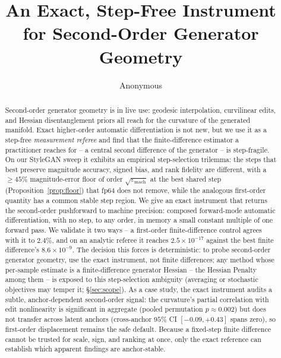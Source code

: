 \documentclass[10pt]{article}
\title{An Exact, Step-Free Instrument for Second-Order Generator Geometry}
\author{\name Anonymous}
\newcommand{\eps}{\varepsilon}
\begin{document}
\maketitle

\begin{abstract}
Second-order generator geometry is in live use: geodesic interpolation, curvilinear
edits, and Hessian disentanglement priors all reach for the curvature of the generated
manifold. Exact higher-order automatic differentiation is not new, but we use it as a
step-free \emph{measurement referee} and find that the finite-difference estimator a
practitioner reaches for -- a central second difference of the generator -- is step-fragile.
On our StyleGAN sweep it exhibits an empirical step-selection trilemma: the steps that best
preserve magnitude accuracy, signed bias, and rank fidelity are different, with a $\geq45\%$
magnitude-error floor of order $\sqrt{\eps_{\mathrm{mach}}}$ at the best shared step
(Proposition~\ref{prop:floor}) that fp64 does not remove, while the analogous first-order
quantity has a common stable step region. We give an exact instrument that returns the
second-order pushforward to machine precision: composed forward-mode automatic
differentiation, with no step, to any order, in memory a small constant multiple of one
forward pass. We validate it two ways -- a first-order finite-difference control agrees
with it to $2.4\%$, and on an analytic referee it reaches $2.5\times10^{-17}$ against the
best finite difference's $8.6\times10^{-9}$. The decision this forces is deterministic:
to probe second-order generator geometry, use the exact instrument, not finite
differences; any method whose per-sample estimate is a finite-difference generator Hessian
-- the Hessian Penalty among them -- is exposed to this step-selection ambiguity (averaging
or stochastic objectives may temper it; \S\ref{sec:scope}). As a case study, the exact
instrument audits a subtle, anchor-dependent second-order signal: the curvature's partial
correlation with edit nonlinearity is significant in aggregate (pooled permutation
$p\approx0.002$) but does not transfer across latent anchors (cross-anchor $95\%$ CI
$[-0.09,+0.43]$ spans zero), so first-order displacement remains the safe default. Because a
fixed-step finite difference cannot be trusted for scale, sign, and ranking at once, only the
exact reference can establish which apparent findings are anchor-stable.
\end{abstract}
\end{document}
